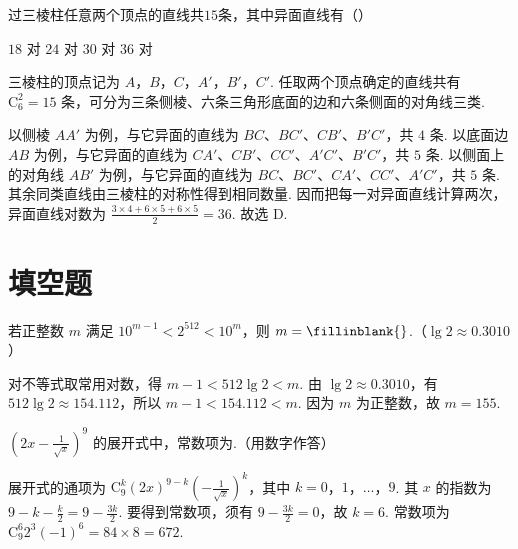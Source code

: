 \begin{problem}
过三棱柱任意两个顶点的直线共\(15\)条，其中异面直线有（\quad）

\choices
    {\(18\text{ 对}\)}
    {\(24\text{ 对}\)}
    {\(30\text{ 对}\)}
    {\(36\text{ 对}\)}

\begin{solution}
三棱柱的顶点记为 \(A\)，\(B\)，\(C\)，\(A'\)，\(B'\)，\(C'\). 任取两个顶点确定的直线共有 \(\mathrm C_{6}^{2}=15\) 条，可分为三条侧棱、六条三角形底面的边和六条侧面的对角线三类.

以侧棱 \(AA'\) 为例，与它异面的直线为 \(BC\)、\(BC'\)、\(CB'\)、\(B'C'\)，共 \(4\) 条. 以底面边 \(AB\) 为例，与它异面的直线为 \(CA'\)、\(CB'\)、\(CC'\)、\(A'C'\)、\(B'C'\)，共 \(5\) 条. 以侧面上的对角线 \(AB'\) 为例，与它异面的直线为 \(BC\)、\(BC'\)、\(CA'\)、\(CC'\)、\(A'C'\)，共 \(5\) 条. 其余同类直线由三棱柱的对称性得到相同数量. 因而把每一对异面直线计算两次，异面直线对数为
\(\displaystyle\frac{3\times4+6\times5+6\times5}{2}=36\). 故选 D.
\end{solution}
\end{problem}

\section{填空题}
\begin{problem}
若正整数 \(m\) 满足 \(10^{m-1} < 2^{512} < 10^{m}\)，则 \(m =\fillinblank{}\).（\(\lg 2 \approx 0.3010\)）

\begin{solution}
对不等式取常用对数，得 \(m-1<512\lg2<m\). 由 \(\lg2\approx0.3010\)，有 \(512\lg2\approx154.112\)，所以 \(m-1<154.112<m\). 因为 \(m\) 为正整数，故 \(m=155\).
\end{solution}
\end{problem}

\begin{problem}
\(\left(2x - \frac{1}{\sqrt{x}}\right)^9\) 的展开式中，常数项为\fillinblank{}.（用数字作答）

\begin{solution}
展开式的通项为 \(\displaystyle\mathrm C_{9}^{k}(2x)^{9-k}\left(-\frac1{\sqrt{x}}\right)^{k}\)，其中 \(k=0\)，\(1\)，\(\ldots\)，\(9\). 其 \(x\) 的指数为 \(9-k-\frac{k}{2}=9-\frac{3k}{2}\). 要得到常数项，须有 \(9-\frac{3k}{2}=0\)，故 \(k=6\). 常数项为
\(\displaystyle\mathrm C_{9}^{6}2^{3}(-1)^{6}=84\times8=672\).
\end{solution}
\end{problem}

